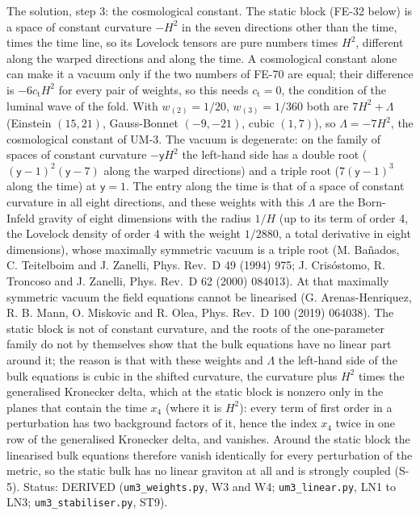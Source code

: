 \documentclass[
  10pt,
]{article}
\begin{document}
The solution, step 3: the cosmological constant. The static block (FE-32
below) is a space of constant curvature \(-H^2\) in the seven directions
other than the time, times the time line, so its Lovelock tensors are
pure numbers times \(H^2\), different along the warped directions and
along the time. A cosmological constant alone can make it a vacuum only
if the two numbers of FE-70 are equal; their difference is
\(-6c_{\mathrm{t}}H^2\) for every pair of weights, so this needs
\(c_{\mathrm{t}} = 0\), the condition of the luminal wave of the fold.
With \(w_{(2)} = 1/20\), \(w_{(3)} = 1/360\) both are \(7H^2 + \Lambda\)
(Einstein \((15, 21)\), Gauss-Bonnet \((-9, -21)\), cubic \((1, 7)\)),
so \(\Lambda = -7H^2\), the cosmological constant of UM-3. The vacuum is
degenerate: on the family of spaces of constant curvature
\(-\mathsf{y}H^2\) the left-hand side has a double root
(\((\mathsf{y} - 1)^2(\mathsf{y} - 7)\) along the warped directions) and
a triple root (\(7(\mathsf{y} - 1)^3\) along the time) at
\(\mathsf{y} = 1\). The entry along the time is that of a space of
constant curvature in all eight directions, and these weights with this
\(\Lambda\) are the Born-Infeld gravity of eight dimensions with the
radius \(1/H\) (up to its term of order 4, the Lovelock density of order
4 with the weight \(1/2880\), a total derivative in eight dimensions),
whose maximally symmetric vacuum is a triple root (M. Bañados, C.
Teitelboim and J. Zanelli, Phys. Rev.~D 49 (1994) 975; J. Crisóstomo, R.
Troncoso and J. Zanelli, Phys. Rev.~D 62 (2000) 084013). At that
maximally symmetric vacuum the field equations cannot be linearised (G.
Arenas-Henriquez, R. B. Mann, O. Miskovic and R. Olea, Phys. Rev.~D 100
(2019) 064038). The static block is not of constant curvature, and the
roots of the one-parameter family do not by themselves show that the
bulk equations have no linear part around it; the reason is that with
these weights and \(\Lambda\) the left-hand side of the bulk equations
is cubic in the shifted curvature, the curvature plus \(H^2\) times the
generalised Kronecker delta, which at the static block is nonzero only
in the planes that contain the time \(x_4\) (where it is \(H^2\)): every
term of first order in a perturbation has two background factors of it,
hence the index \(x_4\) twice in one row of the generalised Kronecker
delta, and vanishes. Around the static block the linearised bulk
equations therefore vanish identically for every perturbation of the
metric, so the static bulk has no linear graviton at all and is strongly
coupled (S-5). Status: DERIVED (\texttt{um3\_weights.py}, W3 and W4;
\texttt{um3\_linear.py}, LN1 to LN3; \texttt{um3\_stabiliser.py}, ST9).
\end{document}
